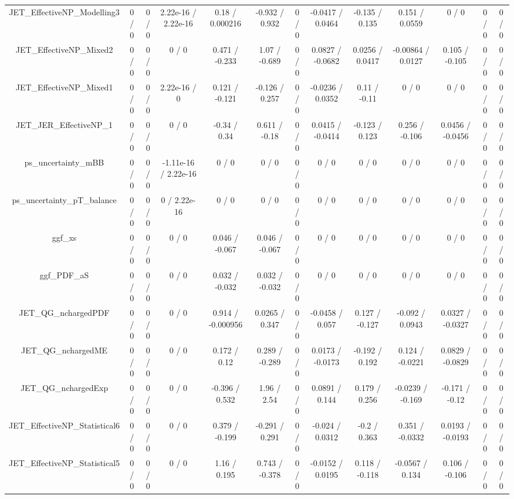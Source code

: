 \documentclass[10pt]{article}
\begin{document}
\begin{table}[htbp]
\begin{center}
\begin{tabular}{|c|c|c|c|c|c|c|c|c|c|c|c|c|}
  JET_EffectiveNP_Modelling3 & 0 / 0 & 0 / 0 & 2.22e-16 / 2.22e-16 & 0.18 / 0.000216 & -0.932 / 0.932 & 0 / 0 & -0.0417 / 0.0464 & -0.135 / 0.135 & 0.151 / 0.0559 & 0 / 0 & 0 / 0 & 0 / 0 \\ 
  JET_EffectiveNP_Mixed2 & 0 / 0 & 0 / 0 & 0 / 0 & 0.471 / -0.233 & 1.07 / -0.689 & 0 / 0 & 0.0827 / -0.0682 & 0.0256 / 0.0417 & -0.00864 / 0.0127 & 0.105 / -0.105 & 0 / 0 & 0 / 0 \\ 
  JET_EffectiveNP_Mixed1 & 0 / 0 & 0 / 0 & 2.22e-16 / 0 & 0.121 / -0.121 & -0.126 / 0.257 & 0 / 0 & -0.0236 / 0.0352 & 0.11 / -0.11 & 0 / 0 & 0 / 0 & 0 / 0 & 0 / 0 \\ 
  JET_JER_EffectiveNP_1 & 0 / 0 & 0 / 0 & 0 / 0 & -0.34 / 0.34 & 0.611 / -0.18 & 0 / 0 & 0.0415 / -0.0414 & -0.123 / 0.123 & 0.256 / -0.106 & 0.0456 / -0.0456 & 0 / 0 & 0 / 0 \\ 
  ps_uncertainty_mBB & 0 / 0 & 0 / 0 & -1.11e-16 / 2.22e-16 & 0 / 0 & 0 / 0 & 0 / 0 & 0 / 0 & 0 / 0 & 0 / 0 & 0 / 0 & 0 / 0 & 0 / 0 \\ 
  ps_uncertainty_pT_balance & 0 / 0 & 0 / 0 & 0 / 2.22e-16 & 0 / 0 & 0 / 0 & 0 / 0 & 0 / 0 & 0 / 0 & 0 / 0 & 0 / 0 & 0 / 0 & 0 / 0 \\ 
  ggf_xs & 0 / 0 & 0 / 0 & 0 / 0 & 0.046 / -0.067 & 0.046 / -0.067 & 0 / 0 & 0 / 0 & 0 / 0 & 0 / 0 & 0 / 0 & 0 / 0 & 0 / 0 \\ 
  ggf_PDF_aS & 0 / 0 & 0 / 0 & 0 / 0 & 0.032 / -0.032 & 0.032 / -0.032 & 0 / 0 & 0 / 0 & 0 / 0 & 0 / 0 & 0 / 0 & 0 / 0 & 0 / 0 \\ 
  JET_QG_nchargedPDF & 0 / 0 & 0 / 0 & 0 / 0 & 0.914 / -0.000956 & 0.0265 / 0.347 & 0 / 0 & -0.0458 / 0.057 & 0.127 / -0.127 & -0.092 / 0.0943 & 0.0327 / -0.0327 & 0 / 0 & 0 / 0 \\ 
  JET_QG_nchargedME & 0 / 0 & 0 / 0 & 0 / 0 & 0.172 / 0.12 & 0.289 / -0.289 & 0 / 0 & 0.0173 / -0.0173 & -0.192 / 0.192 & 0.124 / -0.0221 & 0.0829 / -0.0829 & 0 / 0 & 0 / 0 \\ 
  JET_QG_nchargedExp & 0 / 0 & 0 / 0 & 0 / 0 & -0.396 / 0.532 & 1.96 / 2.54 & 0 / 0 & 0.0891 / 0.144 & 0.179 / 0.256 & -0.0239 / -0.169 & -0.171 / -0.12 & 0 / 0 & 0 / 0 \\ 
  JET_EffectiveNP_Statistical6 & 0 / 0 & 0 / 0 & 0 / 0 & 0.379 / -0.199 & -0.291 / 0.291 & 0 / 0 & -0.024 / 0.0312 & -0.2 / 0.363 & 0.351 / -0.0332 & 0.0193 / -0.0193 & 0 / 0 & 0 / 0 \\ 
  JET_EffectiveNP_Statistical5 & 0 / 0 & 0 / 0 & 0 / 0 & 1.16 / 0.195 & 0.743 / -0.378 & 0 / 0 & -0.0152 / 0.0195 & 0.118 / -0.118 & -0.0567 / 0.134 & 0.106 / -0.106 & 0 / 0 & 0 / 0 \\ 

\end{tabular}
\end{center}
\end{table}
\end{document}
